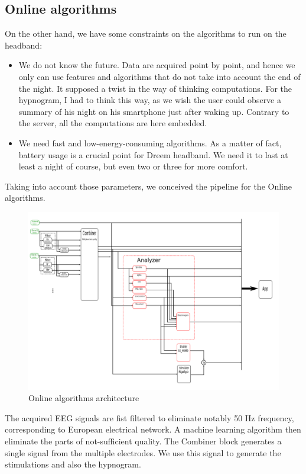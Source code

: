 \documentclass[12pt]{report}
\begin{document}
\subsection{Online algorithms}

On the other hand, we have some constraints on the algorithms to run on the headband:
\begin{itemize}
\item We do not know the future. Data are acquired point by point, and hence we only can use features and algorithms that do not take into account the end of the night. It supposed a twist in the way of thinking computations. For the hypnogram, I had to think this way, as we wish the user could observe a summary of his night on his smartphone just after waking up. Contrary to the server, all the computations are here embedded.
\item We need fast and low-energy-consuming algorithms. As a matter of fact, battery usage is a crucial point for Dreem headband. We need it to last at least a night of course, but even two or three for more comfort.
\end{itemize}

Taking into account those parameters, we conceived the pipeline for the Online algorithms.

\begin{figure}[H]
\centering
\includegraphics[width=1\textwidth]{img/chap1/online_archi.png}
\caption{\label{fig:online_archi}Online algorithms architecture}
\end{figure}

The acquired EEG signals are fist filtered to eliminate notably 50 Hz frequency, corresponding to European electrical network. A machine learning algorithm then eliminate the parts of not-sufficient quality. The Combiner block generates a single signal from the multiple electrodes. We use this signal to generate the stimulations and also the hypnogram.
\end{document}
